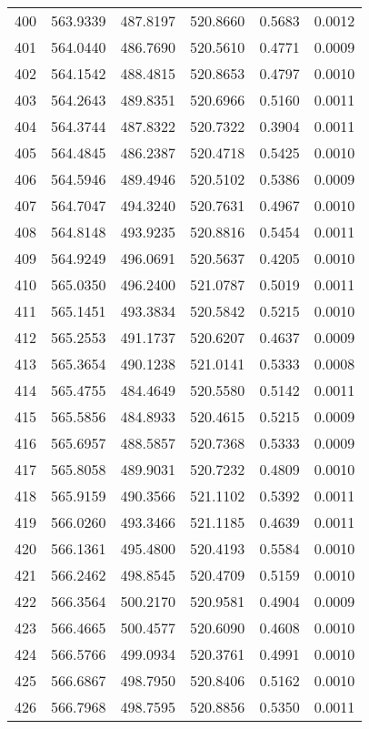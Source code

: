 \documentclass{article}
\begin{document}
\begin{longtable}{|c|c|c|c|c|c|}
400 & 563.9339 & 487.8197 & 520.8660 & 0.5683 & 0.0012 \\
401 & 564.0440 & 486.7690 & 520.5610 & 0.4771 & 0.0009 \\
402 & 564.1542 & 488.4815 & 520.8653 & 0.4797 & 0.0010 \\
403 & 564.2643 & 489.8351 & 520.6966 & 0.5160 & 0.0011 \\
404 & 564.3744 & 487.8322 & 520.7322 & 0.3904 & 0.0011 \\
405 & 564.4845 & 486.2387 & 520.4718 & 0.5425 & 0.0010 \\
406 & 564.5946 & 489.4946 & 520.5102 & 0.5386 & 0.0009 \\
407 & 564.7047 & 494.3240 & 520.7631 & 0.4967 & 0.0010 \\
408 & 564.8148 & 493.9235 & 520.8816 & 0.5454 & 0.0011 \\
409 & 564.9249 & 496.0691 & 520.5637 & 0.4205 & 0.0010 \\
410 & 565.0350 & 496.2400 & 521.0787 & 0.5019 & 0.0011 \\
411 & 565.1451 & 493.3834 & 520.5842 & 0.5215 & 0.0010 \\
412 & 565.2553 & 491.1737 & 520.6207 & 0.4637 & 0.0009 \\
413 & 565.3654 & 490.1238 & 521.0141 & 0.5333 & 0.0008 \\
414 & 565.4755 & 484.4649 & 520.5580 & 0.5142 & 0.0011 \\
415 & 565.5856 & 484.8933 & 520.4615 & 0.5215 & 0.0009 \\
416 & 565.6957 & 488.5857 & 520.7368 & 0.5333 & 0.0009 \\
417 & 565.8058 & 489.9031 & 520.7232 & 0.4809 & 0.0010 \\
418 & 565.9159 & 490.3566 & 521.1102 & 0.5392 & 0.0011 \\
419 & 566.0260 & 493.3466 & 521.1185 & 0.4639 & 0.0011 \\
420 & 566.1361 & 495.4800 & 520.4193 & 0.5584 & 0.0010 \\
421 & 566.2462 & 498.8545 & 520.4709 & 0.5159 & 0.0010 \\
422 & 566.3564 & 500.2170 & 520.9581 & 0.4904 & 0.0009 \\
423 & 566.4665 & 500.4577 & 520.6090 & 0.4608 & 0.0010 \\
424 & 566.5766 & 499.0934 & 520.3761 & 0.4991 & 0.0010 \\
425 & 566.6867 & 498.7950 & 520.8406 & 0.5162 & 0.0010 \\
426 & 566.7968 & 498.7595 & 520.8856 & 0.5350 & 0.0011 \\

\end{longtable}
\end{document}
